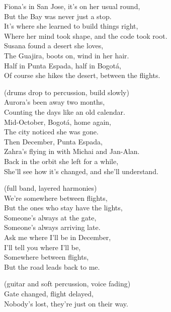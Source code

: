 \begin{lyrics}
Fiona's in San Jose, it's on her usual round,\\
But the Bay was never just a stop.\\
It's where she learned to build things right,\\
Where her mind took shape, and the code took root.\\
Susana found a desert she loves,\\
The Guajira, boots on, wind in her hair.\\
Half in Punta Espada, half in Bogotá,\\
Of course she hikes the desert, between the flights.

 (drums drop to percussion, build slowly)\\
Aurora's been away two months,\\
Counting the days like an old calendar.\\
Mid-October, Bogotá, home again,\\
The city noticed she was gone.\\
Then December, Punta Espada,\\
Zahra's flying in with Michai and Jan-Alan.\\
Back in the orbit she left for a while,\\
She'll see how it's changed, and she'll understand.

 (full band, layered harmonies)\\
We're somewhere between flights,\\
But the ones who stay have the lights,\\
Someone's always at the gate,\\
Someone's always arriving late.\\
Ask me where I'll be in December,\\
I'll tell you where I'll be,\\
Somewhere between flights,\\
But the road leads back to me.

 (guitar and soft percussion, voice fading)\\
Gate changed, flight delayed,\\
Nobody's lost, they're just on their way.
\end{lyrics}

